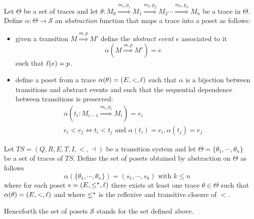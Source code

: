 \begin{definition}
  Let $\Theta$ be a set of traces and let $\theta:M_0\overset{m_1,p_1}{\Rightarrow} M_1\overset{m_2,p_2}{\Rightarrow} M_2 \cdots \overset{m_n,p_n}{\Rightarrow} M_n$ be a trace in $\Theta$. Define $\alpha:\Theta\to\mathcal{S}$ an \emph{abstraction} function that maps a trace into a poset as follows:
  \begin{itemize}
  \item given a transition $M\overset{m,p}{\Rightarrow} M'$ define the \emph{abstract event} $e$ associated to it
    \[
    \alpha(M\overset{m,p}{\Rightarrow} M') = e
    \]
    such that $\ell(e) = p$.
  \item define a poset from a trace $\alpha(\theta) = (E,<,\ell)$ such that $\alpha$ is a bijection between transitions and abstract events and such that the sequential dependence between transitions is preserved:
    \begin{align*}
      \alpha(t_i:M_{i-1}\overset{m_{i},p_{i}}{\Rightarrow}M_i) = e_i \\
      e_i < e_j \iff t_i < t_j \text{ and } \alpha(t_i)=e_i, \alpha(t_j)=e_j
    \end{align*}
  \end{itemize}
\end{definition}

\begin{definition}
  Let $TS = (Q,R,E,T,I,<,\dashv)$ be a transition system and let $\Theta = \{\theta_1,\cdots,\theta_n\}$ be a set of traces of $TS$.
  Define the set of posets obtained by abstraction on $\Theta$ as follows
  \[
  \alpha(\{\theta_1,\cdots,\theta_n\}) = (s_1,\cdots, s_k)\text{ with }k\leq n
  \]
  where for each poset $s = (E,\leq^{\star},\ell)$ there exists at least one trace $\theta\in\Theta$ such that $\alpha(\theta) = (E,<,\ell)$ and where $\leq^{\star}$ is the reflexive and transitive closure of $<$.
\end{definition}

Henceforth the set of posets $\mathcal{S}$ stands for the set defined above.


